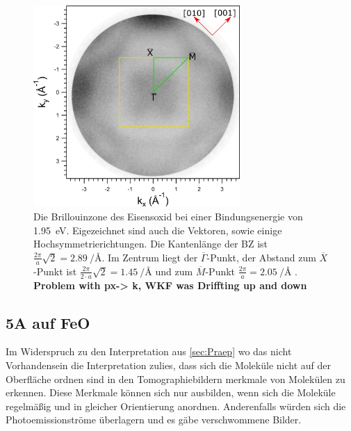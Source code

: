            \begin{figure}
                \centering
                \includegraphics[width=0.7\textwidth]{./content/pictures/FeO/BZ_FeO.png}
                \caption{Die Brillouinzone des Eisensoxid bei einer Bindungsenergie von \SI{1.95}{\electronvolt}.
                Eigezeichnet sind auch die Vektoren, sowie einige Hochsymmetrierichtungen.
                Die Kantenlänge der BZ ist $\frac{2\pi}{a}\sqrt{2} = \SI[per-mode=reciprocal]{2.89}{\per\angstrom}$.
                Im Zentrum liegt der $\overline{\Gamma}$-Punkt, der Abstand zum $\overline{X}$-Punkt ist $\frac{2\pi}{2 \cdot a}\sqrt{2} = \SI[per-mode=reciprocal]{1.45}{\per\angstrom}$ und zum $\overline{M}$-Punkt $\frac{2\pi}{a} = \SI[per-mode=reciprocal]{2.05}{\per\angstrom}$ \cite{Hüfner}.
                \textbf{Problem with px-> k, WKF was Driffting up and down}}
                \label{fig:BZ_FeO}
            \end{figure}

            \subsection{5A auf FeO}
                Im Widerspruch zu den Interpretation aus \autoref{sec:Praep} wo das nicht Vorhandensein die Interpretation zulies, dass sich die Moleküle nicht auf der Oberfläche ordnen sind in den Tomographiebildern merkmale von Molekülen zu erkennen.
                Diese Merkmale können sich nur ausbilden, wenn sich die Moleküle regelmäßig und in gleicher Orientierung anordnen.
                Anderenfalls würden sich die Photoemissionströme überlagern und es gäbe verschwommene Bilder.

